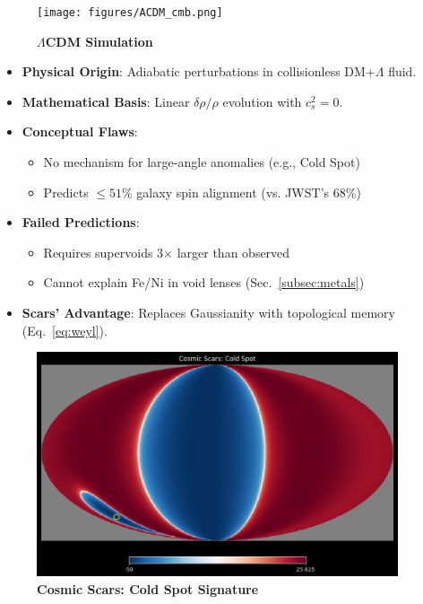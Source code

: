 \documentclass{article}
\begin{document}
\begin{figure}[H]
    \centering
    \texttt{[image: figures/ACDM\_cmb.png]}
    \caption{
        \textbf{$\Lambda$CDM Simulation}
    }
    \label{fig:lcdm_cmb}
\end{figure}

\begin{tcolorbox}[colback=boxnormal,colframe=blue!50!black,title=\textbf{$\Lambda$CDM Limitations}]
\begin{itemize}
    \item \textbf{Physical Origin}: Adiabatic perturbations in collisionless DM+$\Lambda$ fluid.
    \item \textbf{Mathematical Basis}: Linear $\delta\rho/\rho$ evolution with $c_s^2=0$.
    \item \textbf{Conceptual Flaws}:
        \begin{itemize}
            \item No mechanism for large-angle anomalies (e.g., Cold Spot)
            \item Predicts $\leq51\%$ galaxy spin alignment (vs. JWST's $68\%$)
        \end{itemize}
    \item \textbf{Failed Predictions}:
        \begin{itemize}
            \item Requires supervoids 3$\times$ larger than observed
            \item Cannot explain Fe/Ni in void lenses (Sec.~\ref{subsec:metals})
        \end{itemize}
    \item \textbf{Scars' Advantage}: Replaces Gaussianity with topological memory (Eq.~\ref{eq:weyl}).
\end{itemize}
\end{tcolorbox}

\begin{figure}[H]
    \centering
    \includegraphics[width=0.95\textwidth]{figures/Scars_cmb.png}
    \caption{
        \textbf{Cosmic Scars: Cold Spot Signature}
    }
    \label{fig:scars_cmb}
\end{figure}
\end{document}
